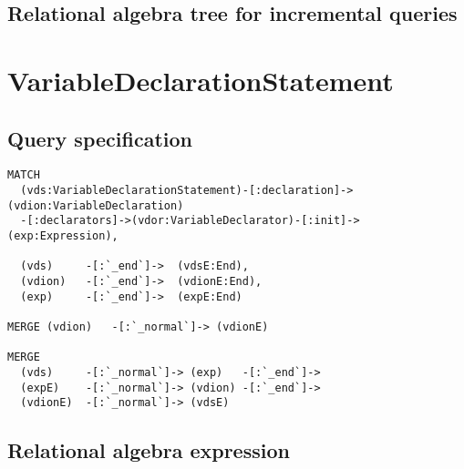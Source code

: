 \subsection*{Relational algebra tree for incremental queries}

\section{VariableDeclarationStatement}

\subsection*{Query specification}

\begin{lstlisting}
MATCH
  (vds:VariableDeclarationStatement)-[:declaration]->(vdion:VariableDeclaration)
  -[:declarators]->(vdor:VariableDeclarator)-[:init]->(exp:Expression),

  (vds)     -[:`_end`]->  (vdsE:End),
  (vdion)   -[:`_end`]->  (vdionE:End),
  (exp)     -[:`_end`]->  (expE:End)

MERGE (vdion)   -[:`_normal`]-> (vdionE)

MERGE
  (vds)     -[:`_normal`]-> (exp)   -[:`_end`]->
  (expE)    -[:`_normal`]-> (vdion) -[:`_end`]->
  (vdionE)  -[:`_normal`]-> (vdsE)
\end{lstlisting}

\subsection*{Relational algebra expression}


